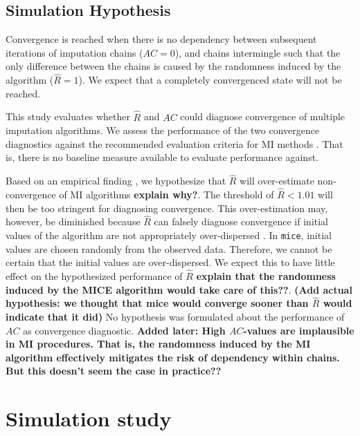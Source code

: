 \documentclass[Royal,times,sageh]{sagej}
\begin{document}
\hypertarget{simulation-hypothesis}{%
\subsection{Simulation Hypothesis}\label{simulation-hypothesis}}

Convergence is reached when there is no dependency between subsequent
iterations of imputation chains (\(AC = 0\)), and chains intermingle
such that the only difference between the chains is caused by the
randomness induced by the algorithm (\(\widehat{R} = 1\)). We expect
that a completely convergenced state will not be reached.

This study evaluates whether \(\widehat{R}\) and \(AC\) could diagnose
convergence of multiple imputation algorithms. We assess the performance
of the two convergence diagnostics against the recommended evaluation
criteria for MI methods \citep[i.e., average bias, average confidence
interval width, and empirical coverage rate across simulations;][\(\S\)
2.5.2]{buur18}. That is, there is no baseline measure available to
evaluate performance against.

Based on an empirical finding \citep{lace07}, we hypothesize that
\(\widehat{R}\) will over-estimate non-convergence of MI algorithms
\textbf{explain why?}. The threshold of \(\widehat{R} < 1.01\) will then
be too stringent for diagnosing convergence. This over-estimation may,
however, be diminished because \(\widehat{R}\) can falsely diagnose
convergence if initial values of the algorithm are not appropriately
over-dispersed \citep[p.~437]{broo98}. In \texttt{mice}, initial values
are chosen randomly from the observed data. Therefore, we cannot be
certain that the initial values are over-dispersed. We expect this to
have little effect on the hypothesized performance of \(\widehat{R}\)
\textbf{explain that the randomness induced by the MICE algorithm would
take care of this??}. \textbf{(Add actual hypothesis: we thought that
mice would converge sooner than \(\widehat{R}\) would indicate that it
did)} No hypothesis was formulated about the performance of \(AC\) as
convergence diagnostic. \textbf{Added later: High \(AC\)-values are
implausible in MI procedures. That is, the randomness induced by the MI
algorithm effectively mitigates the risk of dependency within chains.
But this doesn't seem the case in practice??}

\hypertarget{simulation-study}{%
\section{Simulation study}\label{simulation-study}}
\end{document}
